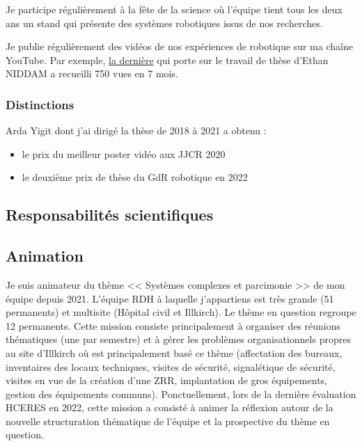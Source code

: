 \documentclass[a4paper,12pt]{article}
\begin{document}
Je participe régulièrement à la fête de la science où l'équipe tient tous les deux ans un stand qui présente des systèmes robotiques issus de nos recherches.

Je publie régulièrement des vidéos de nos expériences de robotique sur ma chaîne YouTube. Par exemple, \href{https://youtu.be/fZkru3tZsYo}{la dernière} qui porte sur le travail de thèse d'Ethan NIDDAM a recueilli 750 vues en 7 mois.

\subsubsection{Distinctions}

Arda Yigit dont j'ai dirigé la thèse de 2018 à 2021 a obtenu :
\begin{itemize}
    \item le prix du meilleur poster vidéo aux JJCR 2020
    \item le deuxième prix de thèse du GdR robotique en 2022
\end{itemize}

\subsection{Responsabilités scientifiques}



\subsection{Animation}

Je suis animateur du thème << Systèmes complexes et parcimonie >> de mon équipe depuis 2021. L’équipe RDH à laquelle j’appartiens est très grande (51 permanents) et multisite (Hôpital civil et Illkirch). Le thème en question regroupe 12 permanents. Cette mission consiste principalement à organiser des réunions thématiques (une par semestre) et à gérer les problèmes organisationnels propres au site d’Illkirch où est principalement basé ce thème (affectation des bureaux, inventaires des locaux techniques, visites de sécurité, signalétique de sécurité, visites en vue de la création d’une ZRR, implantation de gros équipements, gestion des équipements communs). Ponctuellement, lors de la dernière évaluation HCERES en 2022, cette mission a consisté à animer la réflexion autour de la nouvelle structuration thématique de l’équipe et la prospective du thème en question.
\end{document}
